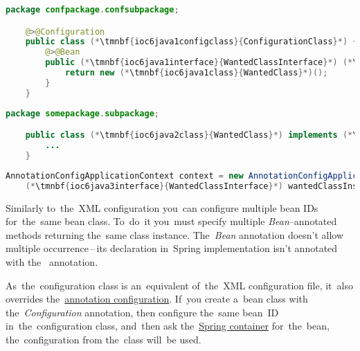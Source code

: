 \begin{lstlisting}[language=Java, title={Configuration class}]
    package confpackage.confsubpackage;

    @>@Configuration
    public class (*\tmnbf{ioc6java1configclass}{ConfigurationClass}*) {
        @>@Bean
        public (*\tmnbf{ioc6java1interface}{WantedClassInterface}*) (*\tmnbf{ioc6java1beanid}{wantedBeanMethod}*)() {
            return new (*\tmnbf{ioc6java1class}{WantedClass}*)();
        }
    }
\end{lstlisting}
\begin{lstlisting}[language=Java, title={Wanted class}]
    package somepackage.subpackage;

    public class (*\tmnbf{ioc6java2class}{WantedClass}*) implements (*\tmnbf{ioc6java2interface}{WantedClassInterface}*) {
        ...
    }
\end{lstlisting}
\begin{lstlisting}[language=Java, title={Usage}]
    AnnotationConfigApplicationContext context = new AnnotationConfigApplicationContext((*\tmnbf{ioc6java3configclass}{ConfigurationClass}*).class);
    (*\tmnbf{ioc6java3interface}{WantedClassInterface}*) wantedClassInstance = context.getBean("(*\tmnbf{ioc6java3beanid}{wantedBeanMethod}[ForestGreen]*)", (*\tmnbf{ioc6java3interface2}{WantedClassInterface}*).class);
\end{lstlisting}

\noindent Similarly to~the~XML configuration you~can configure multiple bean IDs for~the~same bean class.
To~do~it you~must specify multiple \textit{Bean}--annotated methods returning the~same class instance.
The~\textit{Bean} annotation doesn't allow multiple occurrence\,--\,its declaration in~Spring implementation isn't annotated with the~ annotation.

\warning As~the~configuration class is an~equivalent of~the~XML configuration file, it~also overrides the~\hyperref[iocannotations]{annotation configuration}.
If~you create a~bean class with the~\textit{Configuration} annotation, then configure the~same bean~ID in~the~configuration class, and~then ask the~\hyperref[springcontainrer]{Spring container} for~the~bean, the~configuration from the~class will~be used.
\newpage
